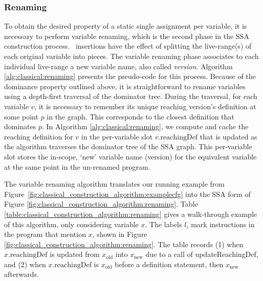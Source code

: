 \subsubsection*{Renaming}
\newcommand\reachingDef[1]{#1.\mathrm{reachingDef}}
To obtain the desired property of a static single assignment per variable,
it is necessary to perform variable renaming, which
is the second phase in the SSA construction process.
\phifun\ insertions have the effect of splitting the live-range(s) of each original variable into pieces. The variable renaming phase associates to each individual live-range a new variable name, also called \emph{version}.
Algorithm \ref{alg:classical:renaming} presents the pseudo-code
for this process.
Because of the dominance property outlined above,
it is straightforward to rename variables
using a depth-first traversal of the dominator tree.
During the traversal, for each variable $v$, it is necessary to
remember its unique reaching version's definition at some point $p$ in
the graph. This corresponds to the closest definition that dominates $p$.
In Algorithm \ref{alg:classical:renaming}, we compute and cache the 
reaching definition for $v$ in the per-variable slot $\reachingDef{v}$
that is updated as the algorithm traverses the dominator tree of the
SSA graph.
This per-variable slot 
stores the in-scope, `new' variable name (version) for the equivalent
variable at the same point in the un-renamed program.

The variable renaming algorithm translates our running example 
from Figure~\ref{fig:classical_construction_algorithm:examplecfg}
into the SSA form of Figure
\ref{fig:classical_construction_algorithm:renaming}.
Table \ref{table:classical_construction_algorithm:renaming} 
gives a walk-through example of this algorithm,
only considering variable $x$. The labels $l_i$ mark
instructions in the program that mention $x$, shown in 
Figure \ref{fig:classical_construction_algorithm:renaming}.
The table records (1) when $\reachingDef{x}$ is updated
from $x_\mathrm{old}$ into
$x_\mathrm{new}$ due to a call of updateReachingDef,
and (2) when $\reachingDef{x}$ is $x_\mathrm{old}$ before
a definition statement, then $x_\mathrm{new}$ afterwards.

